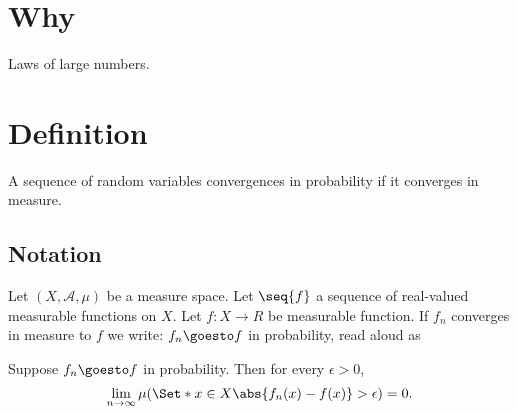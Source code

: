 

\section*{Why}

Laws of large numbers.

\section*{Definition}

A sequence of random variables convergences in probability if it converges in measure.

\subsection*{Notation}

Let $(X, \mathcal{A} , \mu )$ be a measure space.
Let $\seq{f}$ a sequence of real-valued measurable functions on $X$.
Let $f: X \to R$ be measurable function.
If $f_n$ converges in measure to $f$ we write: $f_n \goesto f$ in probability, read aloud as 

Suppose $f_n \goesto f$ in probability.
Then for every $\epsilon  > 0$,
    \[
\lim_{n \to \infty} \mu (\Set*{x \in X}{\abs{f_n(x) - f(x)} > \epsilon }) = 0.
    \]

\blankpage